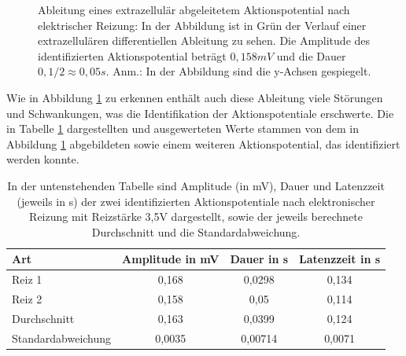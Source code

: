 \documentclass[11pt]{article}
\begin{document}
\begin{figure}[H]
\caption{Ableitung eines extrazellulär abgeleitetem Aktionspotential nach elektrischer Reizung: In der Abbildung ist in Grün der Verlauf einer extrazellulären differentiellen Ableitung zu sehen.  Die Amplitude des identifizierten Aktionspotential beträgt $0,158 mV$ und die Dauer $0,1/2 \approx 0,05 s$. Anm.: In der Abbildung sind die y-Achsen gespiegelt.}
\label{g2}
\end{figure}

Wie in Abbildung \ref{g2} zu erkennen enthält auch diese Ableitung viele Störungen und Schwankungen, was die Identifikation der Aktionspotentiale erschwerte. Die in Tabelle \ref{werte2} dargestellten und ausgewerteten Werte stammen von dem in Abbildung \ref{g2} abgebildeten sowie einem weiteren Aktionspotential, das identifiziert werden konnte.

\begin{table}[H]
\caption{In der untenstehenden Tabelle sind Amplitude (in mV), Dauer und Latenzzeit (jeweils in s) der zwei identifizierten Aktionspotentiale nach elektronischer Reizung mit Reizstärke 3,5V dargestellt, sowie der jeweils berechnete Durchschnitt und die Standardabweichung.}
\begin{center}
\begin{tabular}{l||c|c|c}
Art & Amplitude in mV & Dauer in s & Latenzzeit in s\\
\hline\hline
 Reiz 1& 0,168 & 0,0298 & 0,134\\
Reiz 2& 0,158 & 0,05 & 0,114\\
\hline
Durchschnitt & 0,163 & 0,0399 & 0,124\\
Standardabweichung & 0,0035 &0,00714 & 0,0071
\end{tabular}
\end{center}
\label{werte2}
\end{table}

\end{document}
